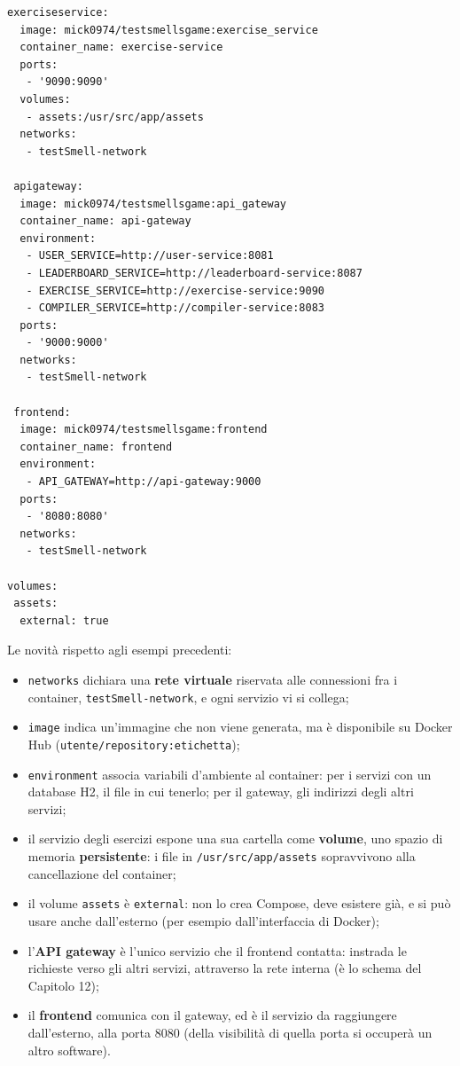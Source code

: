 \begin{lstlisting}[style=yaml, name=docker-compose.yml (2/2), firstnumber=34]
 exerciseservice:
  image: mick0974/testsmellsgame:exercise_service
  container_name: exercise-service
  ports:
   - '9090:9090'
  volumes:
   - assets:/usr/src/app/assets
  networks:
   - testSmell-network

 apigateway:
  image: mick0974/testsmellsgame:api_gateway
  container_name: api-gateway
  environment:
   - USER_SERVICE=http://user-service:8081
   - LEADERBOARD_SERVICE=http://leaderboard-service:8087
   - EXERCISE_SERVICE=http://exercise-service:9090
   - COMPILER_SERVICE=http://compiler-service:8083
  ports:
   - '9000:9000'
  networks:
   - testSmell-network

 frontend:
  image: mick0974/testsmellsgame:frontend
  container_name: frontend
  environment:
   - API_GATEWAY=http://api-gateway:9000
  ports:
   - '8080:8080'
  networks:
   - testSmell-network

volumes:
 assets:
  external: true
\end{lstlisting}

Le novità rispetto agli esempi precedenti:

\begin{itemize}
  \item \texttt{networks} dichiara una \textbf{rete virtuale} riservata alle connessioni fra i container,
        \texttt{testSmell-network}, e ogni servizio vi si collega;
  \item \texttt{image} indica un'immagine che non viene generata, ma è disponibile su Docker Hub
        (\texttt{utente/repository:etichetta});
  \item \texttt{environment} associa variabili d'ambiente al container: per i servizi con un database H2, il file in cui
        tenerlo; per il gateway, gli indirizzi degli altri servizi;
  \item il servizio degli esercizi espone una sua cartella come \textbf{volume}, uno spazio di memoria
        \textbf{persistente}: i file in \texttt{/usr/src/app/assets} sopravvivono alla cancellazione del container;
  \item il volume \texttt{assets} è \texttt{external}: non lo crea Compose, deve esistere già, e si può usare anche
        dall'esterno (per esempio dall'interfaccia di Docker);
  \item l'\textbf{API gateway} è l'unico servizio che il frontend contatta: instrada le richieste verso gli altri
        servizi, attraverso la rete interna (è lo schema del Capitolo 12);
  \item il \textbf{frontend} comunica con il gateway, ed è il servizio da raggiungere dall'esterno, alla porta 8080
        (della visibilità di quella porta si occuperà un altro software).
\end{itemize}

